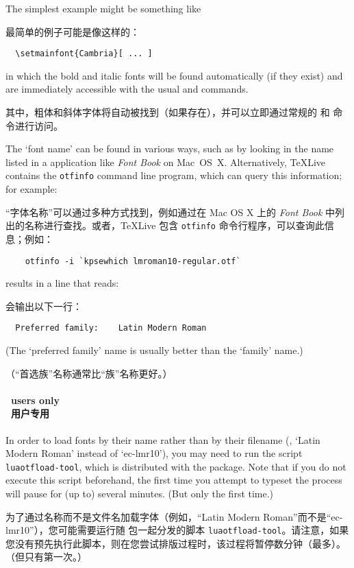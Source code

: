 \documentclass[a4paper]{l3doc}
\begin{document}
The simplest example might be something like

最简单的例子可能是像这样的：
\begin{Verbatim}
  \setmainfont{Cambria}[ ... ]
\end{Verbatim}
in which the bold and italic fonts will be found automatically
(if they exist) and are immediately accessible with the usual
 and  commands.

其中，粗体和斜体字体将自动被找到（如果存在），并可以立即通过常规的  和  命令进行访问。


The `font name' can be found in various ways, such as by looking in the name listed in a application like \emph{Font Book} on Mac~OS~X.
Alternatively, \TeX{}Live contains the \texttt{otfinfo} command line program, which can query this information; for example:

“字体名称”可以通过多种方式找到，例如通过在 Mac OS X 上的 \emph{Font Book} 中列出的名称进行查找。或者，\TeX{}Live 包含 \texttt{otfinfo} 命令行程序，可以查询此信息；例如：

\begin{Verbatim}
    otfinfo -i `kpsewhich lmroman10-regular.otf`
\end{Verbatim}
results in a line that reads:

会输出以下一行：

\begin{Verbatim}
  Preferred family:    Latin Modern Roman
\end{Verbatim}
(The `preferred family' name is usually better than the `family' name.)

（“首选族”名称通常比“族”名称更好。）

\paragraph{\LuaTeX\ users only\\\LuaTeX\ 用户专用}
In order to load fonts by their name rather than by their filename (\eg,
`Latin Modern Roman' instead of `ec-lmr10'), you may need to run the script
\texttt{luaotfload-tool}, which is distributed with the 
package. Note that if you do not execute this script beforehand, the first
time you attempt to typeset the process will pause for (up to) several
minutes. (But only the first time.)

为了通过名称而不是文件名加载字体（例如，“Latin Modern Roman”而不是“ec-lmr10”），您可能需要运行随  包一起分发的脚本 \texttt{luaotfload-tool}。请注意，如果您没有预先执行此脚本，则在您尝试排版过程时，该过程将暂停数分钟（最多）。 （但只有第一次。）
\end{document}
